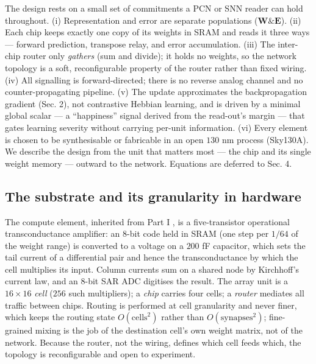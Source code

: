 \documentclass[11pt]{article}
\begin{document}
The design rests on a small set of commitments a PCN or SNN reader can
hold throughout. (i) Representation and error are separate populations
(\(\bm W\&\bm E\)). (ii) Each chip keeps exactly one copy of its weights
in SRAM and reads it three ways --- forward prediction, transpose relay,
and error accumulation. (iii) The inter-chip router only \emph{gathers}
(sum and divide); it holds no weights, so the network topology is a
soft, reconfigurable property of the router rather than fixed wiring.
(iv) All signalling is forward-directed; there is no reverse analog
channel and no counter-propagating pipeline. (v) The update approximates
the backpropagation gradient (Sec. 2), not contrastive Hebbian learning,
and is driven by a minimal global scalar --- a ``happiness'' signal
derived from the read-out's margin --- that gates learning severity
without carrying per-unit information. (vi) Every element is chosen to
be synthesisable or fabricable in an open \(130\) nm process (Sky130A).
We describe the design from the unit that matters most --- the chip and
its single weight memory --- outward to the network. Equations are
deferred to Sec. 4.

\hypertarget{the-substrate-and-its-granularity-in-hardware}{%
\subsection{The substrate and its granularity in
hardware}\label{the-substrate-and-its-granularity-in-hardware}}

The compute element, inherited from Part I \cite{dobney2026analog}, is
a five-transistor operational transconductance amplifier: an 8-bit code
held in SRAM (one step per \(1/64\) of the weight range) is converted to
a voltage on a \(200\) fF capacitor, which sets the tail current of a
differential pair and hence the transconductance by which the cell
multiplies its input. Column currents sum on a shared node by
Kirchhoff's current law, and an 8-bit SAR ADC digitises the result. The
array unit is a \(16\times16\) \emph{cell} (\(256\) such multipliers); a
\emph{chip} carries four cells; a \emph{router} mediates all traffic
between chips. Routing is performed at cell granularity and never finer,
which keeps the routing state \(O(\text{cells}^2)\) rather than
\(O(\text{synapses}^2)\); fine-grained mixing is the job of the
destination cell's own weight matrix, not of the network. Because the
router, not the wiring, defines which cell feeds which, the topology is
reconfigurable and open to experiment.
\end{document}
